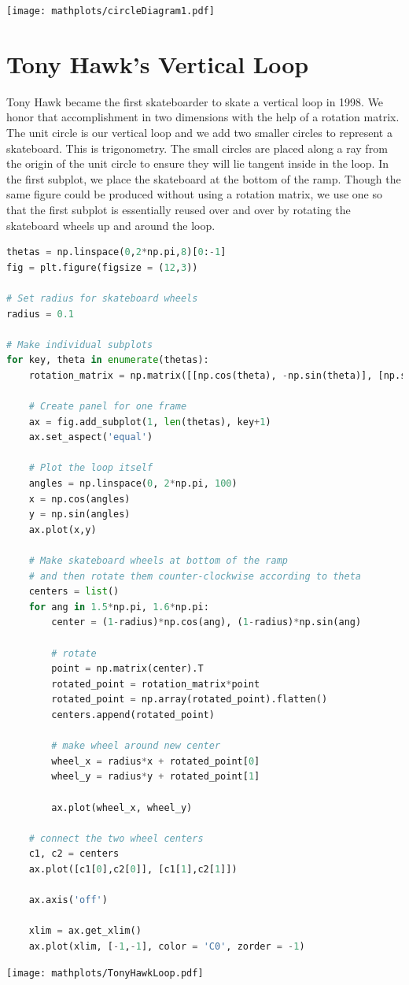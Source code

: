 \begin{center}
\texttt{[image: mathplots/circleDiagram1.pdf]}
\end{center}



\section{Tony Hawk's Vertical Loop}

Tony Hawk became the first skateboarder to skate a vertical loop in 1998. We honor that accomplishment in two dimensions with the help of a rotation matrix. The unit circle is our vertical loop and we add two smaller circles to represent a skateboard. This is trigonometry. The small circles are placed along a ray from the origin of the unit circle to ensure they will lie tangent inside in the loop. In the first subplot, we place the skateboard at the bottom of the ramp. Though the same figure could be produced without using a rotation matrix, we use one so that the first subplot is essentially reused over and over by rotating the skateboard wheels up and around the loop.


\begin{lstlisting}[language = Python]
thetas = np.linspace(0,2*np.pi,8)[0:-1]
fig = plt.figure(figsize = (12,3))

# Set radius for skateboard wheels
radius = 0.1

# Make individual subplots
for key, theta in enumerate(thetas): 
    rotation_matrix = np.matrix([[np.cos(theta), -np.sin(theta)], [np.sin(theta), np.cos(theta)]])

    # Create panel for one frame
    ax = fig.add_subplot(1, len(thetas), key+1)
    ax.set_aspect('equal')

    # Plot the loop itself
    angles = np.linspace(0, 2*np.pi, 100)
    x = np.cos(angles)
    y = np.sin(angles)
    ax.plot(x,y)

    # Make skateboard wheels at bottom of the ramp
    # and then rotate them counter-clockwise according to theta
    centers = list()
    for ang in 1.5*np.pi, 1.6*np.pi:      
        center = (1-radius)*np.cos(ang), (1-radius)*np.sin(ang)

        # rotate 
        point = np.matrix(center).T
        rotated_point = rotation_matrix*point
        rotated_point = np.array(rotated_point).flatten()
        centers.append(rotated_point)
        
        # make wheel around new center
        wheel_x = radius*x + rotated_point[0]
        wheel_y = radius*y + rotated_point[1]

        ax.plot(wheel_x, wheel_y)

    # connect the two wheel centers
    c1, c2 = centers
    ax.plot([c1[0],c2[0]], [c1[1],c2[1]])
    
    ax.axis('off')
    
    xlim = ax.get_xlim()
    ax.plot(xlim, [-1,-1], color = 'C0', zorder = -1)
\end{lstlisting}


\begin{center}
    \texttt{[image: mathplots/TonyHawkLoop.pdf]}
\end{center}
